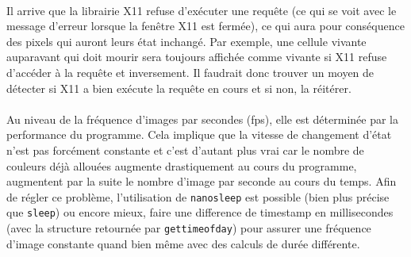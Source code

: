 \documentclass{report}
\begin{document}
\paragraph{} Il arrive que la librairie X11 refuse d'exécuter une requête (ce
qui se voit avec le message d'erreur lorsque la fenêtre X11 est fermée), ce qui
aura pour conséquence des pixels qui auront leurs état inchangé.  Par exemple,
une cellule vivante auparavant qui doit mourir sera toujours affichée comme
vivante si X11 refuse d'accéder à la requête et inversement. Il faudrait donc
trouver un moyen de détecter si X11 a bien exécute la requête en cours et si
non, la réitérer.

\paragraph{} Au niveau de la fréquence d'images par secondes (fps), elle est
déterminée par la performance du programme. Cela implique que la vitesse de
changement d'état n'est pas forcément constante et c'est d'autant plus vrai car
le nombre de couleurs déjà allouées augmente drastiquement au cours du
programme, augmentent par la suite le nombre d'image par seconde au cours du
temps. Afin de régler ce problème, l'utilisation de
\lstinline[style=prog]|nanosleep| est possible (bien plus précise que
\lstinline[style=prog]|sleep|) ou encore mieux, faire une difference de
timestamp en millisecondes (avec la structure retournée par
\lstinline[style=prog]|gettimeofday|) pour assurer une fréquence d'image
constante quand bien même avec des calculs de durée différente. 
\end{document}

